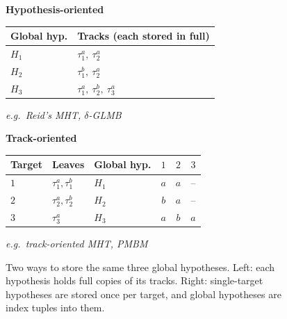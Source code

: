\begin{figure}[htbp]
\centering\small
\begin{minipage}[t]{0.44\textwidth}\centering
\textbf{Hypothesis-oriented}\par\medskip
\begin{tabular}{l l}
\toprule
Global hyp. & Tracks (each stored in full) \\
\midrule
$H_1$ & $\tau_1^{a},\ \tau_2^{a}$ \\
$H_2$ & $\tau_1^{b},\ \tau_2^{a}$ \\
$H_3$ & $\tau_1^{a},\ \tau_2^{b},\ \tau_3^{a}$ \\
\bottomrule
\end{tabular}\par\medskip
\textit{e.g.\ Reid's MHT, $\delta$-GLMB}
\end{minipage}\hfill
\begin{minipage}[t]{0.52\textwidth}\centering
\textbf{Track-oriented}\par\medskip
\begin{tabular}{l l @{\qquad} l c c c}
\toprule
Target & Leaves & Global hyp. & $1$ & $2$ & $3$ \\
\midrule
$1$ & $\tau_1^{a},\tau_1^{b}$ & $H_1$ & $a$ & $a$ & -- \\
$2$ & $\tau_2^{a},\tau_2^{b}$ & $H_2$ & $b$ & $a$ & -- \\
$3$ & $\tau_3^{a}$            & $H_3$ & $a$ & $b$ & $a$ \\
\bottomrule
\end{tabular}\par\medskip
\textit{e.g.\ track-oriented MHT, PMBM}
\end{minipage}
\caption{Two ways to store the same three global hypotheses. Left: each hypothesis holds full copies of its tracks. Right: single-target hypotheses are stored once per target, and global hypotheses are index tuples into them.}
\label{fig:hyprep}
\end{figure}

